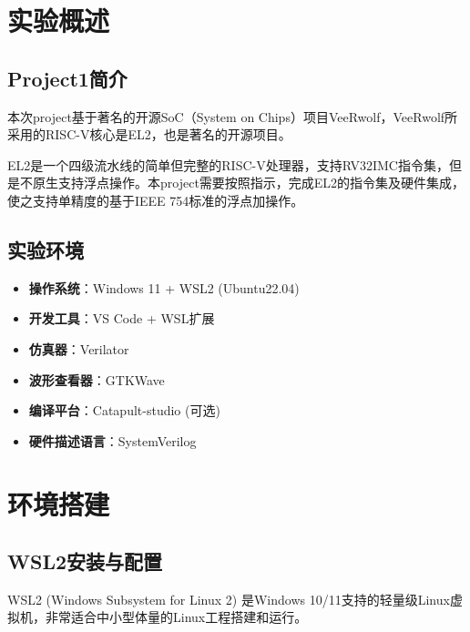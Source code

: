 \documentclass[12pt,a4paper]{article}
\begin{document}

\maketoc

\section{实验概述}

\subsection{Project1简介}
本次project基于著名的开源SoC（System on Chips）项目VeeRwolf，VeeRwolf所采用的RISC-V核心是EL2，也是著名的开源项目。

EL2是一个四级流水线的简单但完整的RISC-V处理器，支持RV32IMC指令集，但是不原生支持浮点操作。本project需要按照指示，完成EL2的指令集及硬件集成，使之支持单精度的基于IEEE 754标准的浮点加操作。



\subsection{实验环境}
\begin{itemize}[itemsep=0pt, parsep=3pt]
    \item \textbf{操作系统}：Windows 11 + WSL2 (Ubuntu22.04)
    \item \textbf{开发工具}：VS Code + WSL扩展
    \item \textbf{仿真器}：Verilator
    \item \textbf{波形查看器}：GTKWave
    \item \textbf{编译平台}：Catapult-studio (可选)
    \item \textbf{硬件描述语言}：SystemVerilog
\end{itemize}

\section{环境搭建}

\subsection{WSL2安装与配置}

WSL2 (Windows Subsystem for Linux 2) 是Windows 10/11支持的轻量级Linux虚拟机，非常适合中小型体量的Linux工程搭建和运行。
\end{document}
